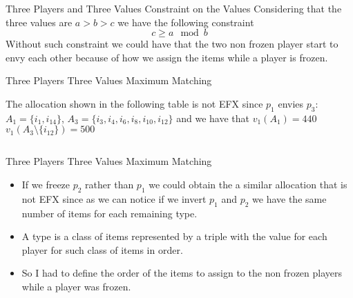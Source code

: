 \begin{frame}{Three Players and Three Values Constraint on the Values}
    Considering that the three values are $a > b > c$ we have the following constraint
    $$
        c\ge a \mod b
    $$
    Without such constraint we could have that the two non frozen player start to envy each other because of how we assign the items while a player is frozen.
\end{frame}

\begin{frame}{Three Players Three Values Maximum Matching}

The allocation shown in the following table is not EFX since $p_1$ envies $p_3$: $A_1 = \{i_1, i_{14}\}$, $A_3 = \{i_3, i_4, i_6, i_8, i_{10}, i_{12}\}$ and we have that $v_1(A_1) = 440$ $v_1(A_3\setminus\{i_{12}\}) = 500$

$$\;$$

\end{frame}

\begin{frame}{Three Players Three Values Maximum Matching}
\begin{itemize}
    \item If we freeze $p_2$ rather than $p_1$ we could obtain the a similar allocation that is not EFX since as we can notice if we invert $p_1$ and $p_2$  we have the same number of items for each remaining type.
    \item A type is a class of items represented by a triple with the value for each player for such class of items in order.
    \item So I had to define the order of the items to assign to the non frozen players while a player was frozen.
\end{itemize}
\end{frame}

